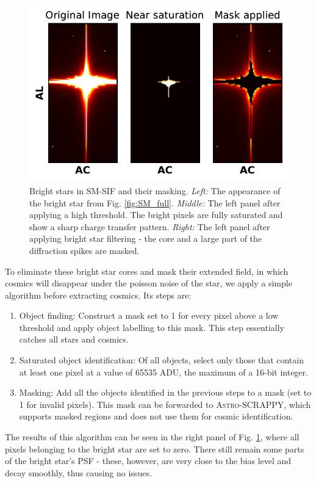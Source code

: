 \documentclass[a4paper, 11pt]{article}
\begin{document}
\begin{figure}
  \centering
  \includegraphics{images/extraction/SM_starmask}
  \caption{Bright stars in SM-SIF and their masking. \textit{Left:} The appearance of the bright star from Fig. \ref{fig:SM_full}. \textit{Middle:} The left panel after applying a high threshold. The bright pixels are fully saturated and show a sharp charge transfer pattern. \textit{Right:} The left panel after applying bright star filtering - the core and a large part of the diffraction spikes are masked.}
  \label{fig:SM_starmask}
\end{figure}

To eliminate these bright star cores and mask their extended field, in which cosmics will disappear under the poisson noise of the star, we apply a simple algorithm before extracting cosmics. Its steps are:
\begin{enumerate}
  \item Object finding: Construct a mask set to 1 for every pixel above a low threshold and apply object labelling to this mask. This step essentially catches all stars and cosmics.
  \item Saturated object identification: Of all objects, select only those that contain at least one pixel at a value of 65535 ADU, the maximum of a 16-bit integer. 
  \item Masking: Add all the objects identified in the previous steps to a mask (set to 1 for invalid pixels). This mask can be forwarded to \textsc{Astro-SCRAPPY}, which supports masked regions and does not use them for cosmic identification.
\end{enumerate}

The results of this algorithm can be seen in the right panel of Fig. \ref{fig:SM_starmask}, where all pixels belonging to the bright star are set to zero. There still remain some parts of the bright star's PSF - these, however, are very close to the bias level and decay smoothly, thus causing no issues.
\end{document}

